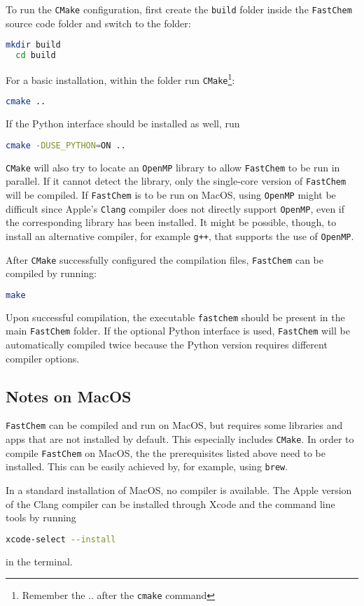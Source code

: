 \documentclass[numbers=noenddot]{fcmanual}
\newcommand{\fc}{\texttt{FastChem}\xspace}
\newcommand{\ttt}[1]{\texttt {#1}}
\begin{document}
To run the \ttt{CMake} configuration, first create the \texttt{build} folder inside the \fc source code folder and switch to the folder:
\begin{lstlisting}[language=bash]
  mkdir build
  cd build
\end{lstlisting}
For a basic installation, within the folder run \texttt{CMake}\footnote{Remember the .. after the \texttt{cmake} command}:
\begin{lstlisting}[language=bash]
  cmake ..
\end{lstlisting}

If the Python interface should be installed as well, run
\begin{lstlisting}[language=bash]
  cmake -DUSE_PYTHON=ON ..
\end{lstlisting}

\texttt{CMake} will also try to locate an \texttt{OpenMP} library to allow \fc to be run in parallel. If it cannot detect the library, only the single-core version of \fc will be compiled. If \fc is to be run on MacOS, using \texttt{OpenMP} might be difficult since Apple's \texttt{Clang} compiler does not directly support \texttt{OpenMP}, even if the corresponding library has been installed. It might be possible, though, to install an alternative compiler, for example \texttt{g++}, that supports the use of \texttt{OpenMP}. 

After \texttt{CMake} successfully configured the compilation files, \fc can be compiled by running:
\begin{lstlisting}[language=bash]
  make
\end{lstlisting}
Upon successful compilation, the executable \texttt{fastchem} should be present in the main \fc folder. If the optional Python interface is used, \fc will be automatically compiled twice because the Python version requires different compiler options.


\subsection{Notes on MacOS}

\fc can be compiled and run on MacOS, but requires some libraries and apps that are not installed by default. This especially includes \texttt{CMake}. In order to compile \fc on MacOS, the the prerequisites listed above need to be installed. This can be easily achieved by, for example, using \texttt{brew}. 

In a standard installation of MacOS, no compiler is available. The Apple version of the Clang compiler can be installed through Xcode and the command line tools by running
\begin{lstlisting}[language=bash]
  xcode-select --install
\end{lstlisting}
in the terminal.
\end{document}
